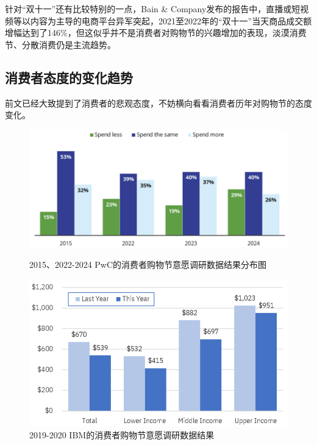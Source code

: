 \documentclass[12pt]{ctexart}
\begin{document}
针对“双十一”还有比较特别的一点，Bain \& Company发布的报告\cite{21}中，直播或短视频等以内容为主导的电商平台异军突起，2021至2022年的“双十一”当天商品成交额增幅达到了146\%，但这似乎并不是消费者对购物节的兴趣增加的表现，淡漠消费节、分散消费仍是主流趋势。


\subsection{消费者态度的变化趋势}

前文已经大致提到了消费者的悲观态度，不妨横向看看消费者历年对购物节的态度变化。

\begin{figure}[htbp!]
    \begin{minipage}[t]{0.53\textwidth}
        \centering
        \includegraphics[width=\textwidth]{Images/20.png}
        \caption{2015、2022-2024 PwC的消费者购物节意愿调研数据结果分布图 \cite{37}}
        \label{attitude_1}
    \end{minipage}
    \hfill
    \begin{minipage}[t]{0.43\textwidth}
        \centering
        \includegraphics[width=\textwidth]{Images/21.png}
        \caption{2019-2020 IBM的消费者购物节意愿调研数据结果 \cite{38}}
        \label{attitude_2}
    \end{minipage}
\end{figure}
\end{document}
